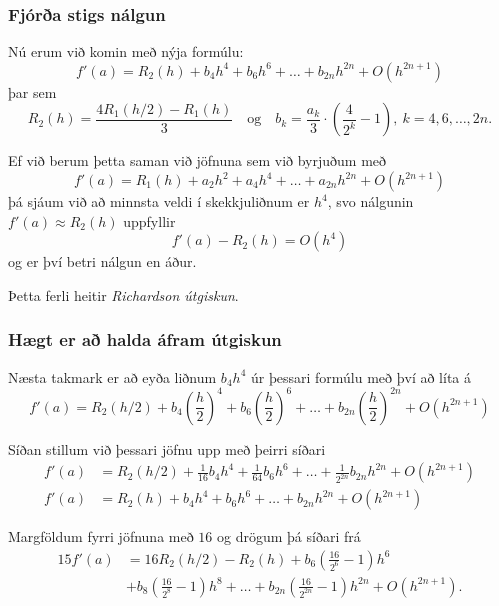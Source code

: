 \documentclass[icelandic,a4paper,12pt]{article}
\begin{document}
\subsubsection{Fjórða stigs nálgun} 
Nú erum við komin með nýja formúlu:
\begin{equation*}
  f'(a) = R_2(h) + b_4 h^4 + b_6 h^6 + \ldots + b_{2n} h^{2n}
  + O(h^{2n+1})
\end{equation*}
þar sem
\begin{equation*}
  R_2(h) = \frac{4 R_1(h/2) - R_1(h)}{3}
  \quad \text{og} \quad
  b_k = \frac{a_k}{3} \cdot \left(\frac{4}{2^k}-1\right),
  \  k = 4,6,\ldots,2n.
\end{equation*}

\pause
Ef við berum þetta saman við jöfnuna sem við byrjuðum með
\begin{equation*}
  f'(a) = R_1(h) 
  + a_2 h^2 + a_4 h^4 + \ldots + a_{2n} h^{2n} + O(h^{2n+1})
\end{equation*}
þá sjáum við að minnsta veldi í skekkjuliðnum er $h^4$, svo nálgunin $f'(a)
\approx R_2(h)$ uppfyllir 
\begin{equation*}
  f'(a) - R_2(h) = O(h^4)
\end{equation*}
og er því betri nálgun en áður. 

\smallskip
 Þetta ferli heitir {\it Richardson útgiskun}.



\subsubsection{Hægt er að halda áfram útgiskun} 
Næsta takmark er að eyða liðnum $b_4h^4$ úr þessari formúlu með því að
líta á 
\begin{equation*}
  f'(a) = R_2(h/2) + b_4 \left(\frac{h}{2}\right)^4 
  + b_6 \left(\frac{h}{2}\right)^6 + \ldots
  + b_{2n} \left(\frac{h}{2}\right)^{2n} + O(h^{2n+1})
\end{equation*}

\pause
Síðan stillum við þessari jöfnu upp með þeirri síðari
\begin{align*}
  f'(a) &= R_2(h/2) + \tfrac 1{16}b_4 h^4 
  + \tfrac 1{64}b_6 h^6 + \ldots
  + \tfrac 1{2^{2n}}b_{2n} h^{2n} + O(h^{2n+1})\\
  f'(a) &= R_2(h) + b_4 h^4 + b_6 h^6 + \ldots + b_{2n} h^{2n}
  + O(h^{2n+1})
\end{align*}

\pause
Margföldum fyrri jöfnuna með $16$ og drögum þá síðari frá 
\begin{align*}
  15f'(a) &= 16 R_2(h/2) - R_2(h) 
  + b_6 \left( \frac{16}{2^6} - 1 \right) h^6 \\
  &+ b_8 \left( \frac{16}{2^8} - 1 \right) h^8
  + \ldots
  + b_{2n} \left( \frac{16}{2^{2n}} - 1 \right) h^{2n}
  + O(h^{2n+1}).
\end{align*}
\end{document}
